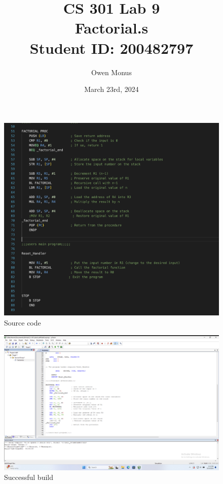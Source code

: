 \documentclass{article}
\begin{document}
\title{CS 301 Lab 9\\[0.5cm]\large Factorial.s\\[0.5cm]\large Student ID: 200482797}
\author{Owen Monus}
\date{March 23rd, 2024}

\maketitle

\pagebreak

\centering
\begin{figure}
\caption{Source code}
\includegraphics[width=\textwidth]{../Images/factorial source code.png}
\end{figure}

\begin{figure}
\caption{Successful build}
\includegraphics[width=\textwidth]{../Images/factorial build.png}
\end{figure}
\end{document}
